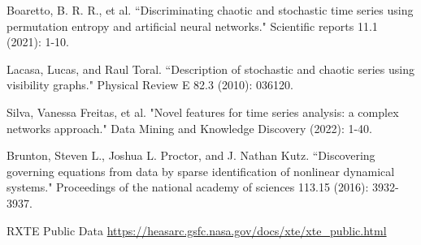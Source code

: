 \documentclass[10pt,conference]{IEEEtran}
\begin{document}
\begin{thebibliography}{1}
Boaretto, B. R. R., et al. ``Discriminating chaotic and stochastic time series using permutation entropy and artificial neural networks." Scientific reports 11.1 (2021): 1-10.

Lacasa, Lucas, and Raul Toral. ``Description of stochastic and chaotic series using visibility graphs." Physical Review E 82.3 (2010): 036120.

Silva, Vanessa Freitas, et al. "Novel features for time series analysis: a complex networks approach." Data Mining and Knowledge Discovery (2022): 1-40.

Brunton, Steven L., Joshua L. Proctor, and J. Nathan Kutz. ``Discovering governing equations from data by sparse identification of nonlinear dynamical systems." Proceedings of the national academy of sciences 113.15 (2016): 3932-3937.



RXTE Public Data \url{https://heasarc.gsfc.nasa.gov/docs/xte/xte_public.html}

\end{thebibliography}

\end{document}
